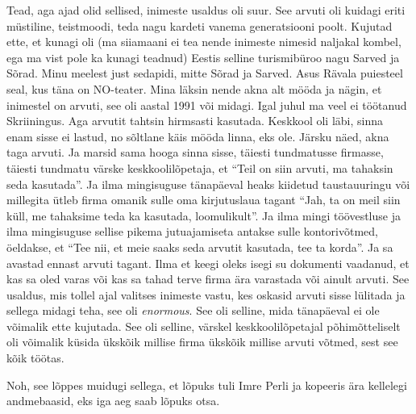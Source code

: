 
Tead, aga ajad olid sellised, inimeste usaldus oli suur. See arvuti oli kuidagi 
eriti müstiline, teistmoodi, teda nagu kardeti vanema 
generatsiooni poolt. Kujutad ette, et kunagi oli (ma siiamaani ei tea nende 
inimeste 
nimesid naljakal kombel, ega ma vist pole ka kunagi teadnud) 
Eestis selline turismibüroo nagu Sarved ja Sõrad. Minu 
meelest just sedapidi, mitte Sõrad ja Sarved. Asus Rävala puiesteel seal, kus 
täna on NO-teater. Mina läksin nende akna alt  
 mööda ja nägin, et inimestel on 
arvuti, see oli aastal 1991 või midagi. Igal juhul ma veel ei töötanud 
Skriiningus. Aga arvutit tahtsin hirmsasti kasutada. Keskkool 
oli läbi, sinna enam sisse ei lastud,  no sõltlane käis mööda linna, eks ole. 
Järsku näed, akna taga arvuti. Ja marsid sama hooga sinna sisse, täiesti 
tundmatusse firmasse, täiesti tundmatu värske keskkoolilõpetaja, et 
\enquote{Teil on siin arvuti, ma tahaksin seda kasutada}. Ja ilma mingisuguse 
tänapäeval heaks kiidetud taustauuringu või millegita ütleb firma omanik sulle 
oma kirjutuslaua tagant \enquote{Jah, ta on meil siin küll, me tahaksime teda 
ka 
kasutada, loomulikult}. Ja ilma mingi töövestluse ja ilma mingisuguse sellise 
pikema jutuajamiseta antakse sulle kontorivõtmed, öeldakse, et \enquote{Tee 
nii, et meie saaks seda arvutit kasutada, tee ta korda}. Ja sa avastad ennast  
arvuti tagant. Ilma et keegi oleks isegi su dokumenti vaadanud, et kas sa oled 
varas või kas sa tahad terve firma ära varastada või 
ainult arvuti. See usaldus, mis tollel ajal valitses inimeste vastu, kes 
oskasid arvuti sisse lülitada ja sellega midagi teha, see oli 
\emph{enormous}.\label{sisu:andrus_usaldus} 
See oli selline, mida tänapäeval ei ole võimalik ette kujutada. See oli 
selline, värskel keskkoolilõpetajal  
põhimõtteliselt oli võimalik küsida ükskõik millise firma ükskõik millise  
arvuti võtmed, sest see kõik töötas. 

Noh, see lõppes muidugi sellega, et lõpuks tuli Imre Perli ja kopeeris ära kellelegi andmebaasid, eks iga 
aeg saab lõpuks otsa. 

